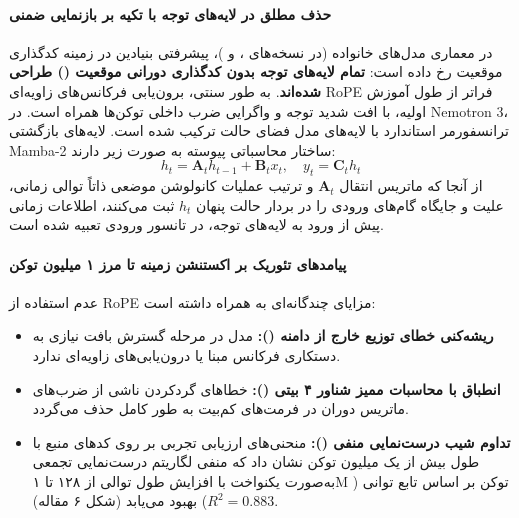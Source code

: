 \item {}

\paragraph*{حذف مطلق  در لایه‌های توجه با تکیه بر بازنمایی ضمنی }
در معماری مدل‌های خانواده  \cite{nvidia2025nemotron3} (در نسخه‌های ،  و )، پیشرفتی بنیادین در زمینه کدگذاری موقعیت رخ داده است: \textbf{تمام لایه‌های توجه بدون کدگذاری دورانی موقعیت () طراحی شده‌اند}.
به طور سنتی، برون‌یابی فرکانس‌های زاویه‌ای RoPE فراتر از طول آموزش اولیه، با افت شدید توجه و واگرایی ضرب داخلی توکن‌ها همراه است. در Nemotron 3، ترانسفورمر استاندارد با لایه‌های مدل فضای حالت  ترکیب شده است. لایه‌های بازگشتی Mamba-2 ساختار محاسباتی پیوسته به صورت زیر دارند:
\begin{equation}
    h_t = \mathbf{A}_t h_{t-1} + \mathbf{B}_t x_t, \quad y_t = \mathbf{C}_t h_t
\end{equation}
از آنجا که ماتریس انتقال $\mathbf{A}_t$ و ترتیب عملیات کانولوشن موضعی ذاتاً توالی زمانی، علیت و جایگاه گام‌های ورودی را در بردار حالت پنهان $h_t$ ثبت می‌کنند، اطلاعات زمانی پیش از ورود به لایه‌های توجه، در تانسور ورودی تعبیه شده است.

\paragraph*{پیامدهای تئوریک بر اکستنشن زمینه تا مرز ۱ میلیون توکن}
عدم استفاده از RoPE مزایای چندگانه‌ای به همراه داشته است:
\begin{itemize}
    \item \textbf{ریشه‌کنی خطای توزیع خارج از دامنه ():} مدل در مرحله گسترش بافت نیازی به دستکاری فرکانس مبنا یا درون‌یابی‌های زاویه‌ای ندارد.
    \item \textbf{انطباق با محاسبات ممیز شناور ۴ بیتی ():} خطاهای گردکردن ناشی از ضرب‌های ماتریس دوران در فرمت‌های کم‌بیت به طور کامل حذف می‌گردد.
    \item \textbf{تداوم شیب درست‌نمایی منفی ():} منحنی‌های ارزیابی تجربی بر روی کدهای منبع با طول بیش از یک میلیون توکن نشان داد که منفی لگاریتم درست‌نمایی تجمعی به‌صورت یکنواخت با افزایش طول توالی از ۱۲۸ تا ۱M توکن بر اساس تابع توانی ($R^2 = 0.883$) بهبود می‌یابد (شکل ۶ مقاله).
\end{itemize}